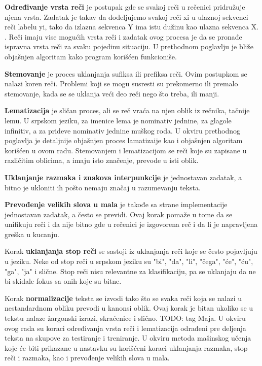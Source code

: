 \documentclass[12pt,oneside]{memoir}
\begin{document}
\textbf{Određivanje vrsta reči} je postupak gde se svakoj reči u rečenici pridružuje njena vrsta.  Zadatak je takav da dodeljujemo svakoj reči xi u ulaznoj sekvenci reči labelu yi,  tako da izlazna sekvenca Y ima istu dužinu kao ulazna sekvenca X.  \cite{postagging}.  Reči imaju vise mogućih vrsta reči i zadatak ovog procesa je da se pronađe ispravna vrsta reči za svaku pojedinu situaciju.  U prethodnom poglavlju je bliže objašnjen algoritam kako program korišćen funkcioniše. 

\textbf{Stemovanje} je proces uklanjanja sufiksa  ili prefiksa reči.  Ovim postupkom se nalazi koren reči.  Problemi koji se mogu susresti su prekomerno ili premalo stemovanje, kada se se uklanja veći deo reči nego što treba, ili manji.  

\textbf{Lematizacija} je sličan proces,  ali se reč vraća na njen oblik iz rečnika,  tačnije lemu.  U srpskom jeziku,  za imenice lema je nominativ jednine,  za glagole infinitiv,  a za prideve nominativ jednine muškog roda.  U okviru prethodnog poglavlja je detaljnije objašnjen proces lamatizaije kao i objašnjen algoritam korišćen u ovom radu.  Stemovanjem i lematizacijom se reči koje su zapisane u različitim oblicima,  a imaju isto značenje,  prevode u isti oblik.  

\textbf{Uklanjanje razmaka i znakova interpunkcije} je jednostavan zadatak, a bitno je ukloniti ih pošto nemaju značaj u razumevanju teksta. 
 
\textbf{Prevođenje velikih slova u mala} je takođe sa strane implementacije jednostavan zadatak,  a često se previdi.  Ovaj korak pomaže u tome da se unifikuju reči i da nije bitno gde u rečenici je izgovorena reč i da li je napravljena greška u kucanju.  

Korak \textbf{uklanjanja stop reči} se sastoji iz uklanjanja reči koje se često pojavljuju u jeziku.  Neke od stop reči u srpskom jeziku su "bi", "da", "li",  "čega",  "će", "ću", "ga", "ja" i slične.  Stop reči nisu relevantne za klasifikaciju, pa se uklanjaju da ne bi skidale fokus sa onih koje su bitne.  

Korak \textbf{normalizacije} teksta se izvodi tako što se svaka reči koja se nalazi u nestandardnom obliku prevodi u kanonsi oblik.  Ovaj korak je bitan ukoliko se u tekstu nalaze žargonski izrazi,  skraćenice i slično. TODO: tag Maja.
U okviru ovog rada su koraci određivanja vrsta reči i lematizacija odrađeni pre deljenja teksta na skupove za testiranje i treniranje.  U okviru metoda mašinskog učenja koje će biti prikazane u nastavku su korišćeni koraci uklanjanja razmaka,  stop reči i razmaka,  kao i prevođenje velikih slova u mala.  
\end{document}
